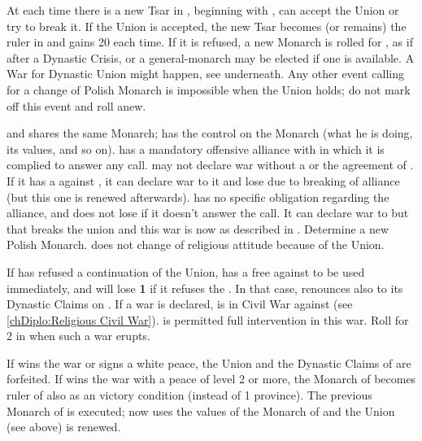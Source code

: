 \effetlong
\aparag At each time there is a new Tsar in \RUS, beginning with
, \POL can accept the Union or try to break it.
\bparag If the Union is accepted, the new Tsar becomes (or remains) the ruler
in \POL and \RUS gains 20 \PV each time.
\bparag If it is refused, a new Monarch is rolled for \POL, as if after a
Dynastic Crisis, or a general-monarch may be elected if one is available.  A
War for Dynastic Union might happen, see underneath.
\bparag Any other event calling for a change of Polish Monarch is impossible
when the Union holds; do not mark off this event and roll anew.



\effetlong
\aparag \RUS and \POL shares the same Monarch; \RUS has the control on the
Monarch (what he is doing, its values, and so on).
\aparag \POL has a mandatory offensive alliance with \RUS in which it is
complied to answer any call.
\aparag \POL may not declare war without a \CB or the agreement of \RUS. If it
has a \CB against \RUS, it can declare war to it and lose \STAB due to
breaking of alliance (but this one is renewed afterwards).
\aparag \RUS has no specific obligation regarding the alliance, and does not
lose \STAB if it doesn't answer the call. It can declare war to \POL but that
breaks the union and this war is now as described in .  Determine a new Polish Monarch.
\aparag \POL does not change of religious attitude because of the Union.



\phdipl
\aparag If \POL has refused a continuation of the Union, \RUS has a free \CB
against \POL to be used immediately, and will lose {\bf 1} \STAB if it refuses
the \CB. In that case, \RUS renounces also to its Dynastic Claims on \POL.
\aparag If a war is declared, \POL is in Civil War against \RUS (see
\ref{chDiplo:Religious Civil War}). \RUS is permitted full intervention in
this war.
\aparag Roll for 2 \REVOLT in \POL when such a war erupts.

\phpaix
\aparag If \POL wins the war or signs a white peace, the Union and the
Dynastic Claims of \RUS are forfeited.
\aparag If \RUS wins the war with a peace of level 2 or more, the Monarch of
\RUS becomes ruler of \POL also as an victory condition (instead of 1
province).
\bparag The previous Monarch of \POL is executed; now \POL uses the values of
the Monarch of \RUS and the Union (see above) is renewed.



